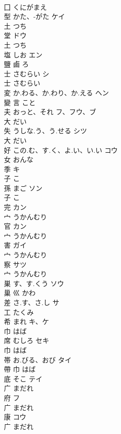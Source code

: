 \documentclass[8pt]{extreport}
\begin{document}
\begin{CJK}{UTF8}{min}
\\	囗		くにがまえ		
\\	型	かた、-がた	ケイ	
\\	土		つち		
\\	堂		ドウ	
\\	土		つち		
\\	塩	しお	エン	
\\	鹽	鹵		ろ		
\\	士	さむらい	シ	
\\	士		さむらい		
\\	変	か.わる、か.わり、か.える	ヘン	
\\	變	言		こと		
\\	夫	おっと、それ	フ、フウ、ブ	
\\	大		だい		
\\	失	うしな.う、う.せる	シツ	
\\	大		だい		
\\	好	この.む、す.く、よ.い、い.い	コウ	
\\	女		おんな		
\\	季		キ	
\\	子		こ		
\\	孫	まご	ソン	
\\	子		こ		
\\	完		カン	
\\	宀		うかんむり		
\\	官		カン	
\\	宀		うかんむり		
\\	害		ガイ	
\\	宀		うかんむり		
\\	察		サツ	
\\	宀		うかんむり		
\\	巣	す、す.くう	ソウ	
\\	巢	巛		かわ		
\\	差	さ.す、さ.し	サ	
\\	工		たくみ		
\\	希	まれ	キ、ケ	
\\	巾		はば		
\\	席	むしろ	セキ	
\\	巾		はば		
\\	帯	お.びる、おび	タイ	
\\	帶	巾		はば		
\\	底	そこ	テイ	
\\	广		まだれ		
\\	府		フ	
\\	广		まだれ		
\\	康		コウ	
\\	广		まだれ		

\end{CJK}
\end{document}
